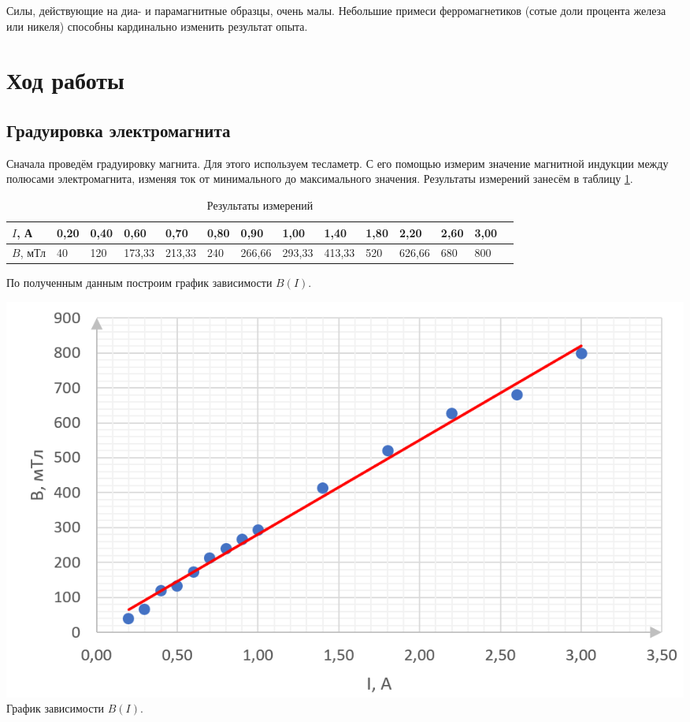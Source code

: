 \documentclass[a4paper,12pt]{article} %
\begin{document}
Силы, действующие на диа- и парамагнитные образцы, очень малы. Небольшие примеси ферромагнетиков (сотые доли процента железа или никеля) способны кардинально изменить результат опыта.

\section{Ход работы}

\subsection{Градуировка электромагнита}

Сначала проведём градуировку магнита. Для этого используем тесламетр. С его помощью измерим значение магнитной индукции между полюсами электромагнита, изменяя ток от минимального до максимального значения. Результаты измерений занесём в таблицу \ref{tab:my-table1}.

\begin{table}[H]
	\centering
	 \begin{tabular}{|l|l|l|l|l|l|l|l|l|l|l|l|l|l|}
		\hline
		$ I $, А   & 0,20  & 0,40  & 0,60  & 0,70  & 0,80  & 0,90  & 1,00  & 1,40  & 1,80  & 2,20  & 2,60  & 3,00  \\ \hline
		$ B $, мТл & 40  & 120  & 173,33  & 213,33  & 240  & 266,66  & 293,33  & 413,33  & 520  & 626,66  & 680  & 800  \\ \hline
	\end{tabular}
	\caption{Результаты измерений}
	\label{tab:my-table1}
\end{table}

По полученным данным построим график зависимости $ B(I) $.

\begin{center}
\includegraphics[width= 16 cm]{B(I).png}
\\
	\caption{График зависимости $ B(I) $.}
	\label{График:1}
\end{center}
\end{document}
